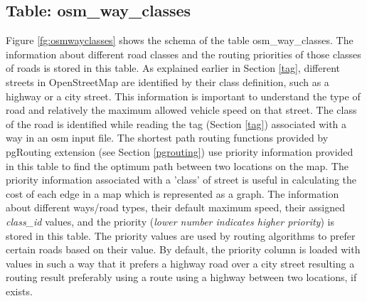 


\subsection{Table: osm{\_}way{\_}classes}
Figure \ref{fg:osmwayclasses} shows the schema of the table osm{\_}way{\_}classes. The information about different road classes and the routing priorities of those classes of roads is stored in this table. As explained earlier in Section \ref{tag}, different streets in OpenStreetMap are identified by their class definition, such as a highway or a city street. This information is important to understand the type of road and relatively the maximum allowed vehicle speed on that street. The class of the road is identified while reading the tag (Section \ref{tag}) associated with a way in an osm input file. The shortest path routing functions provided by pgRouting extension (see Section \ref{pgrouting}) use priority information provided in this table to find the optimum path between two locations on the map. The priority information associated with a 'class' of street is useful in calculating the cost of each edge in a map which is represented as a graph. The information about different ways/road types, their default maximum speed, their assigned \textit{class{\_}id} values, and the priority (\textit{lower number indicates higher priority}) is stored in this table. The priority values are used by routing algorithms to prefer certain roads based on their value. By default, the priority column is loaded with values in such a way that it prefers a highway road over a city street resulting a routing result preferably using a route using a highway between two locations, if exists. \\

